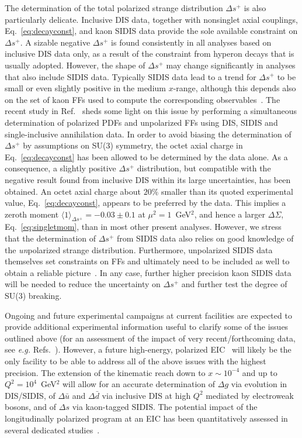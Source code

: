 The determination of the total polarized strange distribution $\Delta s^+$ is 
also particularly delicate.
%
Inclusive DIS data, together with nonsinglet axial couplings, 
Eq.~\eqref{eq:decayconst}, and kaon SIDIS data provide the sole available 
constraint on $\Delta s^+$.
%
A sizable negative $\Delta s^+$ is found 
consistently in all analyses based on inclusive DIS data only, as a result 
of the constraint from hyperon decays that is usually adopted. 
%
However, the shape of $\Delta s^+$ may change significantly in analyses that also include
SIDIS data. Typically SIDIS data lead to a trend for $\Delta s^+$ to be
small or even slightly positive in the medium $x$-range, although this depends 
also on the set of kaon FFs used to compute
the corresponding observables~\cite{Leader:2011tm}.  
%
The recent study in Ref.~\cite{Ethier:2017zbq} sheds some light on this issue
by performing a simultaneous determination of polarized PDFs and unpolarized 
FFs using DIS, SIDIS and single-inclusive annihilation data.
%
In order to avoid biasing the determination of $\Delta s^+$ by 
assumptions on SU(3) symmetry, the octet axial charge in 
Eq.~\eqref{eq:decayconst} has been allowed to be determined by the data alone.
%
As a consequence, a slightly positive $\Delta s^+$ distribution, but
compatible with the negative result found from inclusive DIS within its 
large uncertainties, has been obtained.
% 
An octet axial charge about $20\%$ smaller than its quoted experimental value, 
Eq.~\eqref{eq:decayconst}, appears to be preferred by the data.
%
This implies a zeroth moment $\langle 1\rangle_{\Delta s^+}=-0.03 \pm 0.1$ at 
$\mu^2=1$~GeV$^2$, and hence a larger $\Delta\Sigma$, Eq.~\eqref{eq:singletmom},
than in most other present analyses.
%
However, we stress that the determination of $\Delta s^+$ from SIDIS data 
also relies on good knowledge of the {\it un}polarized strange distribution. 
%
Furthermore, unpolarized SIDIS data themselves set constraints on 
FFs and ultimately need to be included as well
to obtain a reliable picture~\cite{Borsa:2017vwy}. 
%
In any case, further higher precision kaon SIDIS data will be needed 
to reduce the uncertainty on $\Delta s^+$ and further test the degree of 
SU(3) breaking. 

Ongoing and future experimental campaigns at current facilities are
expected to provide additional experimental information
useful to clarify some of the issues outlined above (for an 
assessment of the impact of very recent/forthcoming data, see {\it e.g.}
Refs.~\cite{Aschenauer:2015eha,Aschenauer:2015ata,Nocera:2015vva,
Nocera:2017wep}).
%
However, a future high-energy, polarized EIC~\cite{Accardi:2012qut} will 
likely be the only facility to be able to address all of the above issues 
with the highest precision. 
% 
The extension of the kinematic reach down to $x\sim 10^{-4}$ and up to
$Q^2=10^4$~GeV$^2$ will allow for an accurate determination of $\Delta g$
via evolution in DIS/SIDIS, of $\Delta\bar{u}$ and 
$\Delta\bar{d}$ via inclusive DIS at high $Q^2$ mediated by electroweak bosons,
and of $\Delta s$ via kaon-tagged SIDIS. 
%
The potential impact of the longitudinally polarized program at an EIC
has been quantitatively assessed in several dedicated 
studies~\cite{Aschenauer:2012ve,Ball:2013tyh,Aschenauer:2013iia,
Aschenauer:2015ata}.


